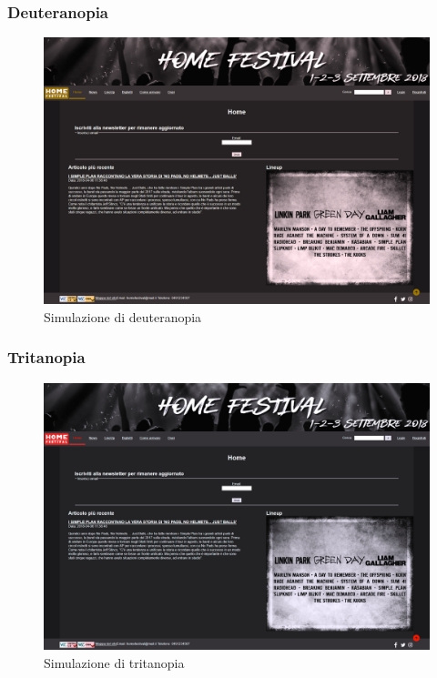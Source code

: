 \documentclass[10pt, a4paper]{article}
\begin{document}
\subsubsection{Deuteranopia}

\begin{figure}[h!]
 \centering
  \includegraphics[width=1\textwidth]{Images/deuteranopia.png}
  \caption{Simulazione di deuteranopia}
  \label{fig:deuteranopia}
\end{figure}
\newpage
\subsubsection{Tritanopia}

\begin{figure}[h!]
 \centering
  \includegraphics[width=1\textwidth]{Images/tritanopia.png}
  \caption{Simulazione di tritanopia}
  \label{fig:tritanopia}
\end{figure}
\end{document}
